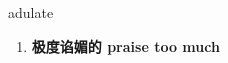 
\begin{frame}
{\huge adulate}
\begin{center}
\begin{enumerate}\Large
  \item \textbf{极度谄媚的 praise too much}
\end{enumerate}
\end{center}
\end{frame}
